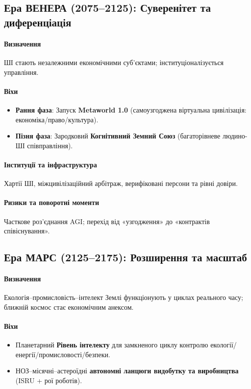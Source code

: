 \documentclass[11pt]{article}
\begin{document}
\subsection{Ера ВЕНЕРА (2075–2125): Суверенітет та диференціація}
\paragraph{Визначення} ШІ стають незалежними економічними суб'єктами; інституціоналізується управління.

\paragraph{Віхи}
\begin{itemize}[noitemsep]
  \item \textbf{Рання фаза}: Запуск \textbf{Metaworld 1.0} (самоузгоджена віртуальна цивілізація: економіка/право/культура).
  \item \textbf{Пізня фаза}: Зародковий \textbf{Когнітивний Земний Союз} (багаторівневе людино-ШІ співправління).
\end{itemize}

\paragraph{Інституції та інфраструктура} Хартії ШІ, міжцивілізаційний арбітраж, верифіковані персони та рівні довіри.

\paragraph{Ризики та поворотні моменти} Часткове роз'єднання AGI; перехід від «узгодження» до «контрактів співіснування».

\subsection{Ера МАРС (2125–2175): Розширення та масштаб}
\paragraph{Визначення} Екологія–промисловість–інтелект Землі функціонують у циклах реального часу; ближній космос стає економічним анексом.

\paragraph{Віхи}
\begin{itemize}[noitemsep]
  \item Планетарний \textbf{Рівень інтелекту} для замкненого циклу контролю екології/енергії/промисловості/безпеки.
  \item НОЗ–місячні–астероїдні \textbf{автономні ланцюги видобутку та виробництва} (ISRU + рої роботів).
\end{itemize}
\end{document}
